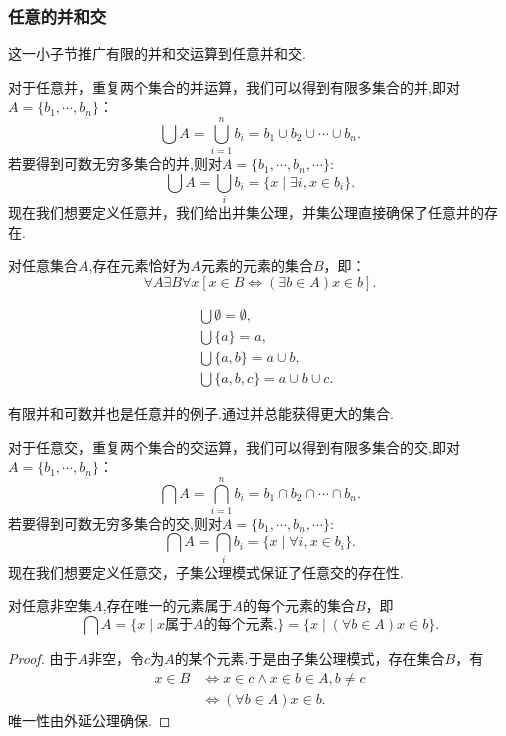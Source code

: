 \subsubsection{任意的并和交}

这一小子节推广有限的并和交运算到任意并和交.

对于任意并，重复两个集合的并运算，我们可以得到有限多集合的并,即对$A=\{b_1,\cdots,b_n\}$：
\[\bigcup A=\bigcup_{i=1}^n b_i=b_1\cup b_2\cup\cdots\cup b_n.\]
若要得到可数无穷多集合的并,则对$A=\{b_1,\cdots,b_n,\cdots\}$:
\[\bigcup A=\bigcup_i b_i=\{x\mid \exists i, x\in b_i\}.\]
现在我们想要定义任意并，我们给出并集公理，并集公理直接确保了任意并的存在.

\begin{axiom}
    对任意集合$A$,存在元素恰好为$A$元素的元素的集合$B$，即：
    \[\forall A\exists B\forall x[x\in B\iff (\exists b\in A)x\in b].\]
\end{axiom}

\begin{example}
    \begin{align*}
        &\bigcup\emptyset=\emptyset,\\
        &\bigcup\{a\}=a,\\
        &\bigcup\{a,b\}=a\cup b,\\
        &\bigcup\{a,b,c\}=a\cup b\cup c.
    \end{align*}
\end{example}

有限并和可数并也是任意并的例子.通过并总能获得更大的集合.

对于任意交，重复两个集合的交运算，我们可以得到有限多集合的交,即对$A=\{b_1,\cdots,b_n\}$：
\[\bigcap A=\bigcap_{i=1}^n b_i=b_1\cap b_2\cap\cdots\cap b_n.\]
若要得到可数无穷多集合的交,则对$A=\{b_1,\cdots,b_n,\cdots\}$:
\[\bigcap A=\bigcap_i b_i=\{x\mid \forall i, x\in b_i\}.\]
现在我们想要定义任意交，子集公理模式保证了任意交的存在性.
\begin{theorem}
    [任意交]
    对任意非空集$A$,存在唯一的元素属于$A$的每个元素的集合$B$，即
    \[\bigcap A=\{x\mid x\textit{属于}A\textit{的每个元素}.\}=\{x\mid (\forall b\in A)x\in b\}.\]
\end{theorem}
\begin{proof}
    由于$A$非空，令$c$为$A$的某个元素.于是由子集公理模式，存在集合$B$，有
    \begin{align*}
        x\in B &\iff x\in c\wedge x\in b\in A,b\ne c\\
        &\iff (\forall b\in A)x\in b.
    \end{align*} 
    唯一性由外延公理确保.
\end{proof}

